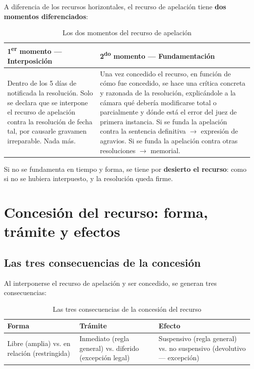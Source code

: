 \documentclass[12pt,oneside]{book}
\begin{document}
A diferencia de los recursos horizontales, el recurso de apelación tiene \textbf{dos momentos diferenciados}:

\begin{table}[H]
\centering
\caption{Los dos momentos del recurso de apelación}
\begin{tabularx}{\textwidth}{X X}
\toprule
\textbf{1\textsuperscript{er} momento --- Interposición} & \textbf{2\textsuperscript{do} momento --- Fundamentación} \\
\midrule
Dentro de los 5 días de notificada la resolución. Solo se declara que se interpone el recurso de apelación contra la resolución de fecha tal, por causarle gravamen irreparable. Nada más. &
Una vez concedido el recurso, en función de cómo fue concedido, se hace una crítica concreta y razonada de la resolución, explicándole a la cámara qué debería modificarse total o parcialmente y dónde está el error del juez de primera instancia. Si se funda la apelación contra la sentencia definitiva $\rightarrow$ expresión de agravios. Si se funda la apelación contra otras resoluciones $\rightarrow$ memorial. \\
\bottomrule
\end{tabularx}
\end{table}

Si no se fundamenta en tiempo y forma, se tiene por \textbf{desierto el recurso}: como si no se hubiera interpuesto, y la resolución queda firme.

\chapter{Concesión del recurso: forma, trámite y efectos}

\section{Las tres consecuencias de la concesión}

Al interponerse el recurso de apelación y ser concedido, se generan tres consecuencias:

\begin{table}[H]
\centering
\caption{Las tres consecuencias de la concesión del recurso}
\begin{tabularx}{\textwidth}{X X X}
\toprule
\textbf{Forma} & \textbf{Trámite} & \textbf{Efecto} \\
\midrule
Libre (amplia) vs. en relación (restringida) & Inmediato (regla general) vs. diferido (excepción legal) & Suspensivo (regla general) vs. no suspensivo (devolutivo --- excepción) \\
\bottomrule
\end{tabularx}
\end{table}
\end{document}
